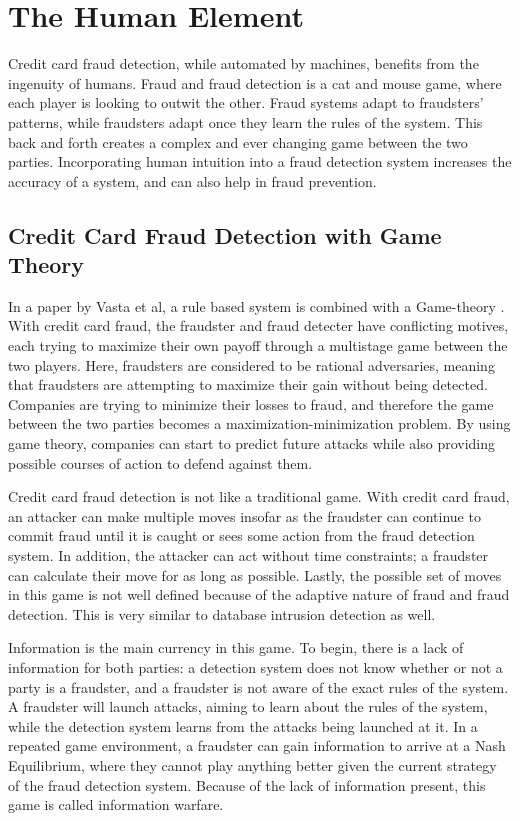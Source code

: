 \documentclass[midd]{thesis}
\begin{document}
\section{The Human Element}

Credit card fraud detection, while automated by machines, benefits from the ingenuity of humans. Fraud and fraud detection is a cat and mouse game, where each player is looking to outwit the other. Fraud systems adapt to fraudsters' patterns, while fraudsters adapt once they learn the rules of the system. This back and forth creates a complex and ever changing game between the two parties. Incorporating human intuition into a fraud detection system increases the accuracy of a system, and can also help in fraud prevention. 

\subsection{Credit Card Fraud Detection with Game Theory}

 
In a paper by Vasta et al, a rule based system is combined with a Game-theory \cite{Vatsa2007}. With credit card fraud, the fraudster and fraud detecter have conflicting motives, each trying to maximize their own payoff through a multistage game between the two players. Here, fraudsters are considered to be rational adversaries, meaning that fraudsters are attempting to maximize their gain without being detected. Companies are trying to minimize their losses to fraud, and therefore the game between the two parties becomes a maximization-minimization problem. By using game theory, companies can start to predict future attacks while also providing possible courses of action to defend against them.
 
Credit card fraud detection is not like a traditional game. With credit card fraud, an attacker can make multiple moves insofar as the fraudster can continue to commit fraud until it is caught or sees some action from the fraud detection system. In addition, the attacker can act without time constraints; a fraudster can calculate their move for as long as possible. Lastly, the possible set of moves in this game is not well defined because of the adaptive nature of fraud and fraud detection. This is very similar to database intrusion detection as well. 

Information is the main currency in this game. To begin, there is a lack of information for both parties: a detection system does not know whether or not a party is a fraudster, and a fraudster is not aware of the exact rules of the system. A fraudster will launch attacks, aiming to learn about the rules of the system, while the detection system learns from the attacks being launched at it. In a repeated game environment, a fraudster can gain information to arrive at a Nash Equilibrium, where they cannot play anything better given the current strategy of the fraud detection system. Because of the lack of information present, this game is called information warfare.
\end{document}
